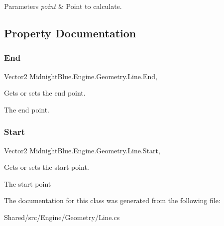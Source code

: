 \begin{DoxyParams}{Parameters}
{\em point} & Point to calculate.\\
\hline
\end{DoxyParams}


\subsection{Property Documentation}
\hypertarget{class_midnight_blue_1_1_engine_1_1_geometry_1_1_line_ad825e12a4c0889bd9a6999b473b3e317}{}\label{class_midnight_blue_1_1_engine_1_1_geometry_1_1_line_ad825e12a4c0889bd9a6999b473b3e317} 
\subsubsection{\texorpdfstring{End}{End}}
{\footnotesize\ttfamily Vector2 Midnight\+Blue.\+Engine.\+Geometry.\+Line.\+End\hspace{0.3cm}{\ttfamily [get]}, {\ttfamily [set]}}



Gets or sets the end point. 

The end point.\hypertarget{class_midnight_blue_1_1_engine_1_1_geometry_1_1_line_ad4ca913b1c73c20d7af64652bd3ae7fa}{}\label{class_midnight_blue_1_1_engine_1_1_geometry_1_1_line_ad4ca913b1c73c20d7af64652bd3ae7fa} 
\subsubsection{\texorpdfstring{Start}{Start}}
{\footnotesize\ttfamily Vector2 Midnight\+Blue.\+Engine.\+Geometry.\+Line.\+Start\hspace{0.3cm}{\ttfamily [get]}, {\ttfamily [set]}}



Gets or sets the start point. 

The start point

The documentation for this class was generated from the following file\+:\begin{DoxyCompactItemize}
\item 
Shared/src/\+Engine/\+Geometry/Line.\+cs\end{DoxyCompactItemize}
